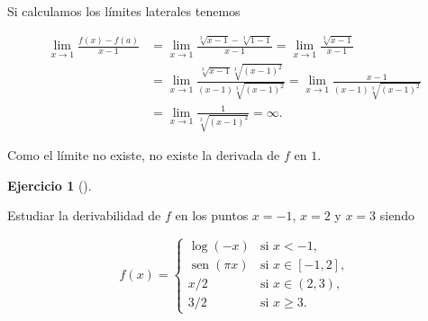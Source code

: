 \documentclass[
  spanish,
  a4paper,
]{scrreport}
\theoremstyle{definition}
\newtheorem{exercise}{Ejercicio}[chapter]
\theoremstyle{remark}
\begin{document}
\begin{tcolorbox}[enhanced jigsaw, arc=.35mm, bottomrule=.15mm, bottomtitle=1mm, breakable, colback=white, colbacktitle=quarto-callout-tip-color!10!white, colframe=quarto-callout-tip-color-frame, coltitle=black, left=2mm, leftrule=.75mm, opacityback=0, opacitybacktitle=0.6, rightrule=.15mm, title=\textcolor{quarto-callout-tip-color}{\faLightbulb}\hspace{0.5em}{Solución}, titlerule=0mm, toprule=.15mm, toptitle=1mm]

Si calculamos los límites laterales tenemos

\begin{align*}
\lim_{x\to 1}\frac{f(x)-f(a)}{x-1} &= \lim_{x\to 1}\frac{\sqrt[3]{x-1}-\sqrt[3]{1-1}}{x-1} = \lim_{x\to 1} \frac{\sqrt[3]{x-1}}{x-1} \\ 
&= \lim_{x\to 1} \frac{\sqrt[3]{x-1}\sqrt[3]{(x-1)^2}}{(x-1)\sqrt[3]{(x-1)^2}} = \lim_{x\to 1} \frac{x-1}{(x-1)\sqrt[3]{(x-1)^2}} \\ 
&= \lim_{x\to 1} \frac{1}{\sqrt[3]{(x-1)^2}} = \infty.
\end{align*}

Como el límite no existe, no existe la derivada de \(f\) en \(1\).

\end{tcolorbox}

\begin{exercise}[]\protect\hypertarget{exr-derivabilidad-funcion-trozos-1}{}\label{exr-derivabilidad-funcion-trozos-1}

Estudiar la derivabilidad de \(f\) en los puntos \(x=-1\), \(x=2\) y
\(x=3\) siendo

\[
f(x)=
\begin{cases}
\log(-x) & \mbox{si $x<-1$,} \\
\operatorname{sen}(\pi x) & \mbox{si $x\in [-1,2]$,} \\
x/2 & \mbox{si $x\in (2,3)$,} \\
3/2 & \mbox{si $x\geq 3$.}
\end{cases}
\]

\end{exercise}
\end{document}
